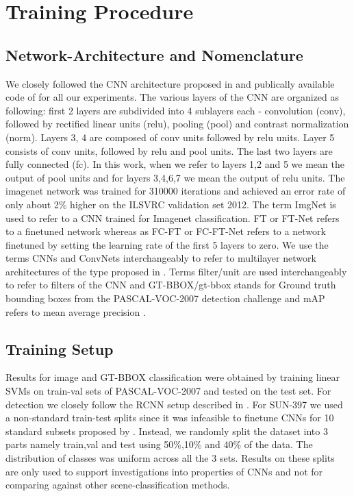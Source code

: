 \section{Training Procedure}
\label{sec:train}
\subsection{Network-Architecture and Nomenclature}
\label{sub:net-arch}
We closely followed the CNN architecture proposed in \cite{Kriz} and publically available code of \cite{caffe} for all our experiments. The various layers of the CNN are organized as following: first 2 layers are subdivided into 4 sublayers each - convolution (conv), followed by rectified linear units (relu), pooling (pool) and contrast normalization (norm). Layers 3, 4 are composed of conv units followed by relu units. Layer 5 consists of conv units, followed by relu and pool units. The last two layers are fully connected (fc). In this work, when we refer to layers 1,2 and 5 we mean the output of pool units and for layers 3,4,6,7 we mean the output of relu units. The imagenet network was trained for 310000 iterations and achieved an error rate of only about 2\% higher on the ILSVRC validation set 2012. \newline
The term ImgNet is used to refer to a CNN trained for Imagenet classification. FT or FT-Net refers to a finetuned network whereas as FC-FT or FC-FT-Net refers to a network finetuned by setting the learning rate of the first 5 layers to zero. We use the terms CNNs and ConvNets interchangeably to refer to multilayer network architectures of the type proposed in \cite{Kriz}. Terms filter/unit are used interchangeably to refer to filters of the CNN and GT-BBOX/gt-bbox stands for Ground truth bounding boxes from the PASCAL-VOC-2007 detection challenge and mAP refers to mean average precision \cite{Pascal}.

\subsection{Training Setup} 
\label{sub:train-setup}
Results for image and GT-BBOX classification were obtained by training linear SVMs on train-val sets of PASCAL-VOC-2007 \cite{Pascal} and tested on the test set. For detection we closely follow the RCNN setup described in \cite{Rcnn}. For SUN-397 \cite{sun} we used a non-standard train-test splits since it was infeasible to finetune CNNs for 10 standard subsets proposed by \cite{sun}. Instead, we randomly split the dataset into 3 parts namely train,val and test using 50\%,10\% and 40\% of the data. The distribution of classes was uniform across all the 3 sets. Results on these splits are only used to support investigations into properties of CNNs and not for comparing against other scene-classification methods.  
 
